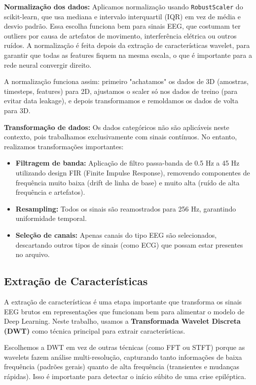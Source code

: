 \documentclass[12pt,a4paper]{article}
\begin{document}
\textbf{Normalização dos dados:} Aplicamos normalização usando \texttt{RobustScaler} do scikit-learn, que usa mediana e intervalo interquartil (IQR) em vez de média e desvio padrão. Essa escolha funciona bem para sinais EEG, que costumam ter outliers por causa de artefatos de movimento, interferência elétrica ou outros ruídos. A normalização é feita depois da extração de características wavelet, para garantir que todas as features fiquem na mesma escala, o que é importante para a rede neural convergir direito.

A normalização funciona assim: primeiro "achatamos" os dados de 3D (amostras, timesteps, features) para 2D, ajustamos o scaler só nos dados de treino (para evitar data leakage), e depois transformamos e remoldamos os dados de volta para 3D.

\textbf{Transformação de dados:} Os dados categóricos não são aplicáveis neste contexto, pois trabalhamos exclusivamente com sinais contínuos. No entanto, realizamos transformações importantes:
\begin{itemize}
    \item \textbf{Filtragem de banda:} Aplicação de filtro passa-banda de 0.5 Hz a 45 Hz utilizando design FIR (Finite Impulse Response), removendo componentes de frequência muito baixa (drift de linha de base) e muito alta (ruído de alta frequência e artefatos).
    \item \textbf{Resampling:} Todos os sinais são reamostrados para 256 Hz, garantindo uniformidade temporal.
    \item \textbf{Seleção de canais:} Apenas canais do tipo EEG são selecionados, descartando outros tipos de sinais (como ECG) que possam estar presentes no arquivo.
\end{itemize}

\subsection{Extração de Características}

A extração de características é uma etapa importante que transforma os sinais EEG brutos em representações que funcionam bem para alimentar o modelo de Deep Learning. Neste trabalho, usamos a \textbf{Transformada Wavelet Discreta (DWT)} como técnica principal para extrair características.

Escolhemos a DWT em vez de outras técnicas (como FFT ou STFT) porque as wavelets fazem análise multi-resolução, capturando tanto informações de baixa frequência (padrões gerais) quanto de alta frequência (transientes e mudanças rápidas). Isso é importante para detectar o início súbito de uma crise epiléptica.
\end{document}
